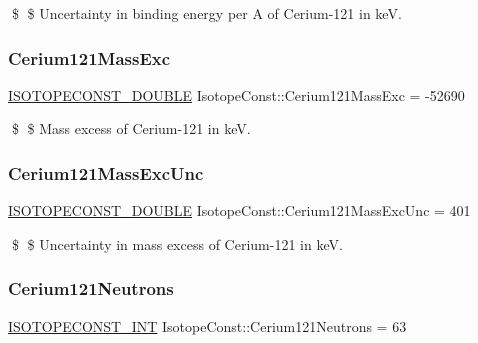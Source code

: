 \$ \$ Uncertainty in binding energy per A of Cerium-\/121 in keV. \mbox{\label{group___isotope_const-_cerium-_ce121_gaa4169beac6835eb89f8f5942a7f62937}} 
\subsubsection{\texorpdfstring{Cerium121\+Mass\+Exc}{Cerium121MassExc}}
{\footnotesize\ttfamily \mbox{\hyperlink{group___isotope_const-_macros_ga8f45a7272ce02c0b4c65c44636ed719a}{I\+S\+O\+T\+O\+P\+E\+C\+O\+N\+S\+T\+\_\+\+D\+O\+U\+B\+LE}} Isotope\+Const\+::\+Cerium121\+Mass\+Exc = -\/52690}

\$ \$ Mass excess of Cerium-\/121 in keV. \mbox{\label{group___isotope_const-_cerium-_ce121_ga0fac78b2ec06c528adcca304455ecf53}} 
\subsubsection{\texorpdfstring{Cerium121\+Mass\+Exc\+Unc}{Cerium121MassExcUnc}}
{\footnotesize\ttfamily \mbox{\hyperlink{group___isotope_const-_macros_ga8f45a7272ce02c0b4c65c44636ed719a}{I\+S\+O\+T\+O\+P\+E\+C\+O\+N\+S\+T\+\_\+\+D\+O\+U\+B\+LE}} Isotope\+Const\+::\+Cerium121\+Mass\+Exc\+Unc = 401}

\$ \$ Uncertainty in mass excess of Cerium-\/121 in keV. \mbox{\label{group___isotope_const-_cerium-_ce121_ga621adab1f2c75575ff18455227bb227a}} 
\subsubsection{\texorpdfstring{Cerium121\+Neutrons}{Cerium121Neutrons}}
{\footnotesize\ttfamily \mbox{\hyperlink{group___isotope_const-_macros_ga5f18360b3e99483a35c32d789e62621c}{I\+S\+O\+T\+O\+P\+E\+C\+O\+N\+S\+T\+\_\+\+I\+NT}} Isotope\+Const\+::\+Cerium121\+Neutrons = 63}

